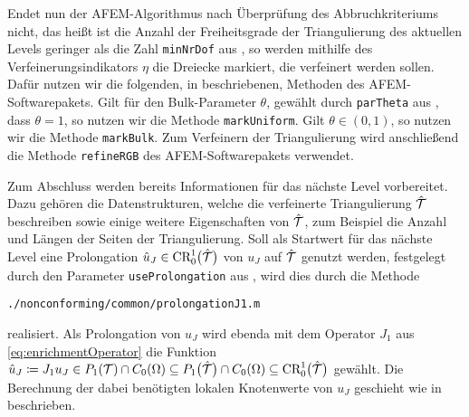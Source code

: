 Endet nun der AFEM-Algorithmus nach Überprüfung des Abbruchkriteriums nicht,
das heißt ist die Anzahl der Freiheitsgrade der Triangulierung des aktuellen
Levels geringer als die Zahl \texttt{minNrDof} aus , so
werden mithilfe des Verfeinerungsindikators $\eta$ die Dreiecke markiert, die
verfeinert werden sollen. 
Dafür nutzen wir die folgenden, in \cite[Abschnitt 1.6]{CGKNRR10}
beschriebenen, Methoden des AFEM-Softwarepakets.
Gilt für den Bulk-Parameter $\theta$, gewählt durch \texttt{parTheta} aus
, dass $\theta=1$, so nutzen
wir die Methode \texttt{markUniform}. Gilt $\theta\in(0,1)$, so nutzen wir
die Methode \texttt{markBulk}.
Zum Verfeinern der Triangulierung wird anschließend die Methode
\texttt{refineRGB} \cite[1.7.2]{CGKNRR10} des AFEM-Softwarepakets verwendet.

Zum Abschluss werden bereits Informationen für das nächste Level vorbereitet. 
Dazu gehören die Datenstrukturen, welche die verfeinerte Triangulierung
$\hat{\mathcal{T}}$ beschreiben sowie einige weitere Eigenschaften von
$\hat{\mathcal{T}}$, zum Beispiel die Anzahl und Längen der Seiten der Triangulierung.
Soll als Startwert für das nächste Level eine Prolongation $\hat
u_J\in\textup{CR}^1_0\big(\hat{\mathcal{T}}\big)$ von $u_J$ auf $\hat{\mathcal{T}}$ genutzt werden,
festgelegt durch den Parameter \texttt{useProlongation} aus
, wird dies durch die Methode
\begin{center}
  \texttt{./nonconforming/common/prolongationJ1.m}
\end{center}
realisiert. 
Als Prolongation von $u_J$ wird ebenda mit dem Operator $J_1$ aus
\eqref{eq:enrichmentOperator} die Funktion $\hat u_J\coloneqq J_1 u_J\in
P_1(\mathcal{T})\cap C_0(\Omega)\subseteq P_1\big(\hat{\mathcal{T}}\big)\cap C_0(\Omega)
\subseteq \textup{CR}^1_0\big(\hat{\mathcal{T}}\big)$ gewählt.
Die Berechnung der dabei benötigten lokalen Knotenwerte von $u_J$ geschieht
wie in  beschrieben.

